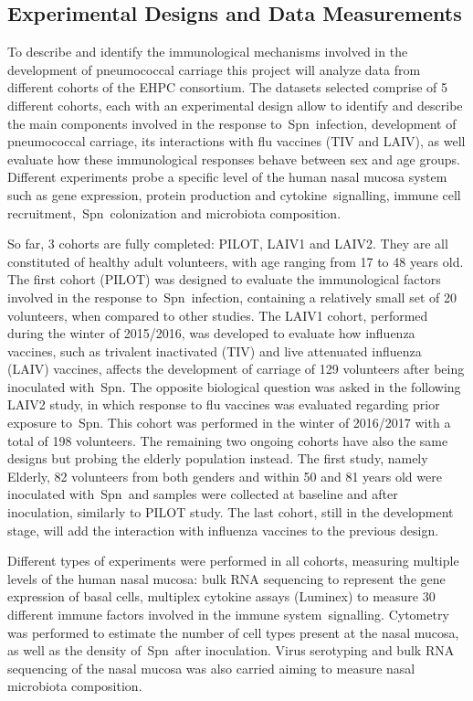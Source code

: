 \documentclass[
]{book}
\begin{document}
\hypertarget{experimental-designs-and-data-measurements}{%
\subsection{Experimental Designs and Data Measurements}\label{experimental-designs-and-data-measurements}}

To describe and identify the immunological mechanisms involved in the development of pneumococcal carriage this project will analyze data from different cohorts of the EHPC consortium. The datasets selected comprise of 5 different cohorts, each with an experimental design allow to identify and describe the main components involved in the response to~Spn~infection, development of pneumococcal carriage, its interactions with flu vaccines (TIV and LAIV), as well evaluate how these immunological responses behave between sex and age groups. Different experiments probe a specific level of the human nasal mucosa system such as gene expression, protein production and cytokine~signalling, immune cell recruitment,~Spn~colonization and microbiota composition.

So far, 3 cohorts are fully completed: PILOT, LAIV1 and LAIV2. They are all constituted of healthy adult volunteers, with age ranging from 17 to 48 years old. The first cohort (PILOT) was designed to evaluate the immunological factors involved in the response to~Spn~infection, containing a relatively small set of 20 volunteers, when compared to other studies. The LAIV1 cohort, performed during the winter of 2015/2016, was developed to evaluate how influenza vaccines, such as trivalent inactivated (TIV) and live attenuated influenza (LAIV) vaccines, affects the development of carriage of 129 volunteers after being inoculated with~Spn. The opposite biological question was asked in the following LAIV2 study, in which response to flu vaccines was evaluated regarding prior exposure to~Spn. This cohort was performed in the winter of 2016/2017 with a total of 198 volunteers. The remaining two ongoing cohorts have also the same designs but probing the elderly population instead. The first study, namely Elderly, 82 volunteers from both genders and within 50 and 81 years old were inoculated with~Spn~and samples were collected at baseline and after inoculation, similarly to PILOT study. The last cohort, still in the development stage, will add the interaction with influenza vaccines to the previous design.

Different types of experiments were performed in all cohorts, measuring multiple levels of the human nasal mucosa: bulk RNA sequencing to represent the gene expression of basal cells, multiplex cytokine assays (Luminex) to measure 30 different immune factors involved in the immune system~signalling. Cytometry was performed to estimate the number of cell types present at the nasal mucosa, as well as the density of~Spn~after inoculation. Virus serotyping and bulk RNA sequencing of the nasal mucosa was also carried aiming to measure nasal microbiota composition.
\end{document}
